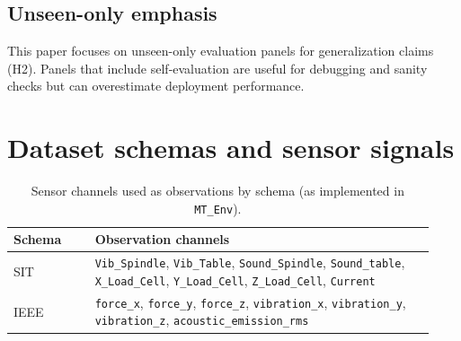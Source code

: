 \documentclass[refree,sn-basic]{sn-jnl} %
\begin{document}
\begin{appendices}
\subsection{Unseen-only emphasis}
This paper focuses on unseen-only evaluation panels for generalization claims (H2). Panels that include self-evaluation are useful for debugging and sanity checks but can overestimate deployment performance.

\section{Dataset schemas and sensor signals}
\label{app:schema}
\begin{table}[t]
\centering
\caption{Sensor channels used as observations by schema (as implemented in \texttt{MT\_Env}).}
\label{tab:schema_features}
\begin{tabular}{p{0.18\linewidth} p{0.75\linewidth}}
\toprule
\textbf{Schema} & \textbf{Observation channels}\\
\midrule
SIT & \texttt{Vib\_Spindle}, \texttt{Vib\_Table}, \texttt{Sound\_Spindle}, \texttt{Sound\_table}, \texttt{X\_Load\_Cell}, \texttt{Y\_Load\_Cell}, \texttt{Z\_Load\_Cell}, \texttt{Current}\\
IEEE & \texttt{force\_x}, \texttt{force\_y}, \texttt{force\_z}, \texttt{vibration\_x}, \texttt{vibration\_y}, \texttt{vibration\_z}, \texttt{acoustic\_emission\_rms}\\
\bottomrule
\end{tabular}
\end{table}


\end{appendices}
\end{document}
